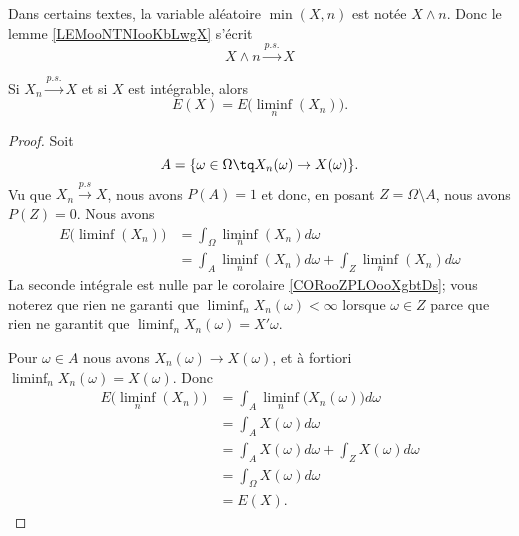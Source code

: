 \begin{normaltext}
	Dans certains textes, la variable aléatoire \( \min(X,n)\) est notée \( X\wedge n\). Donc le lemme \ref{LEMooNTNIooKbLwgX} s'écrit
	\begin{equation}
		X\wedge n\stackrel{p.s.}{\longrightarrow}X
	\end{equation}
\end{normaltext}

\begin{proposition}	\label{PROPooDWTWooPygbmK}
	Si \( X_n\stackrel{ p.s.}{\longrightarrow} X\) et si \( X\) est intégrable, alors
	\begin{equation}
		E(X)=E\big( \liminf_n(X_n) \big).
	\end{equation}
\end{proposition}

\begin{proof}
	Soit
	\begin{equation}
		A=\{ \omega\in\Omega\tq X_n(\omega)\to X(\omega) \}.
	\end{equation}
	Vu que \( X_n\stackrel{ p.s}{\longrightarrow} X\), nous avons \( P(A)=1\) et donc, en posant \( Z=\Omega\setminus A\), nous avons \( P(Z)=0\). Nous avons
	\begin{subequations}
		\begin{align}
			E\big( \liminf(X_n) \big) & =\int_{\Omega}\liminf_n(X_n)d\omega                          \\
			                          & =\int_{A}\liminf_n(X_n)d\omega+\int_{Z}\liminf_n(X_n)d\omega
		\end{align}
	\end{subequations}
	La seconde intégrale est nulle par le corolaire \ref{CORooZPLOooXgbtDs}; vous noterez que rien ne garanti que \( \liminf_n X_n(\omega)<\infty\) lorsque \( \omega\in Z\) parce que rien ne garantit que \( \liminf_nX_n(\omega)=X'\omega\).

	Pour \( \omega\in A\) nous avons \( X_n(\omega)\to X(\omega)\), et à fortiori \( \liminf_n X_n(\omega)=X(\omega)\). Donc
	\begin{subequations}
		\begin{align}
			E\big( \liminf_n(X_n) \big) & =\int_A\liminf_n\big( X_n(\omega) \big)d\omega  \\
			                            & =\int_AX(\omega)d\omega                         \\
			                            & =\int_AX(\omega)d\omega +\int_ZX(\omega)d\omega \\
			                            & =\int_{\Omega}X(\omega)d\omega                  \\
			                            & =E(X).
		\end{align}
	\end{subequations}
\end{proof}


